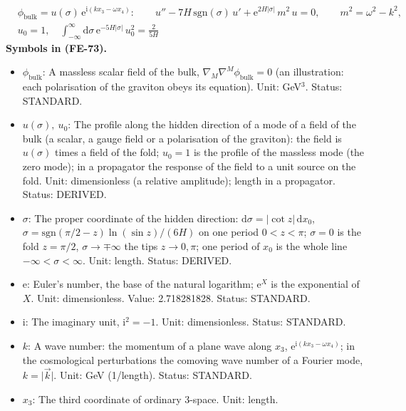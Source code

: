 \documentclass[
  10pt,
]{article}
\providecommand{\tightlist}{%
  \setlength{\itemsep}{0pt}\setlength{\parskip}{0pt}}
\begin{document}
\[
\begin{aligned}
&\phi_{\mathrm{bulk}} = u(\sigma)\,\mathrm{e}^{\mathrm{i}(kx_3 - \omega x_4)}:\qquad
u'' - 7H\,\mathrm{sgn}(\sigma)\,u' + \mathrm{e}^{2H\lvert\sigma\rvert}\,m^2\,u = 0,\qquad m^2 = \omega^2 - k^2,\\
&u_0 = 1,\quad \int_{-\infty}^{\infty}\mathrm{d}\sigma\,\mathrm{e}^{-5H\lvert\sigma\rvert}\,u_0^2 = \frac{2}{5H}
\end{aligned} \tag{FE-73}
\] \textbf{Symbols in (FE-73).}

\begin{itemize}
\tightlist
\item
  \(\phi_{\mathrm{bulk}}\): A massless scalar field of the bulk,
  \(\nabla_M\nabla^M\phi_{\mathrm{bulk}} = 0\) (an illustration: each
  polarisation of the graviton obeys its equation). Unit: GeV\(^3\).
  Status: STANDARD.
\item
  \(u(\sigma),\ u_0\): The profile along the hidden direction of a mode
  of a field of the bulk (a scalar, a gauge field or a polarisation of
  the graviton): the field is \(u(\sigma)\) times a field of the fold;
  \(u_0 = 1\) is the profile of the massless mode (the zero mode); in a
  propagator the response of the field to a unit source on the fold.
  Unit: dimensionless (a relative amplitude); length in a propagator.
  Status: DERIVED.
\item
  \(\sigma\): The proper coordinate of the hidden direction:
  \(\mathrm{d}\sigma = \lvert\cot z\rvert\,\mathrm{d}x_0\),
  \(\sigma = \mathrm{sgn}(\pi/2 - z)\ln(\sin z)/(6H)\) on one period
  \(0 < z < \pi\); \(\sigma = 0\) is the fold \(z = \pi/2\),
  \(\sigma \to \mp\infty\) the tips \(z \to 0, \pi\); one period of
  \(x_0\) is the whole line \(-\infty < \sigma < \infty\). Unit: length.
  Status: DERIVED.
\item
  \(\mathrm{e}\): Euler's number, the base of the natural logarithm;
  \(\mathrm{e}^{X}\) is the exponential of \(X\). Unit: dimensionless.
  Value: 2.718281828. Status: STANDARD.
\item
  \(\mathrm{i}\): The imaginary unit, \(\mathrm{i}^2 = -1\). Unit:
  dimensionless. Status: STANDARD.
\item
  \(k\): A wave number: the momentum of a plane wave along \(x_3\),
  \(\mathrm{e}^{\mathrm{i}(kx_3 - \omega x_4)}\); in the cosmological
  perturbations the comoving wave number of a Fourier mode,
  \(k = \lvert\vec k\rvert\). Unit: GeV (1/length). Status: STANDARD.
\item
  \(x_3\): The third coordinate of ordinary 3-space. Unit: length.

\end{itemize}
\end{document}
